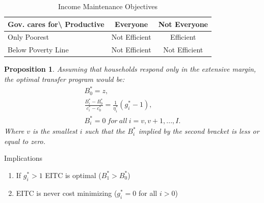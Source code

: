\documentclass[xcolor=pdftex,dvipsnames,table]{beamer}
\newtheorem{prop}{Proposition}
\begin{document}
\begin{frame}[label=imp_literature]
\begin{table}[htbp]
  \centering
  \caption{Income Maintenance Objectives}
    \begin{tabular}{l|cc}
    \toprule
    Gov. cares for\textbackslash{} Productive & Everyone & Not Everyone \\
    \midrule
    Only Poorest & Not Efficient & Efficient \\
    Below Poverty Line & Not Efficient & Not Efficient \\
    \bottomrule
    \end{tabular}
\end{table}
\hyperlink{prop_imp}{}
\end{frame}

\begin{frame}[label=eitc]
\begin{prop}
\label{prop_extensive}
	Assuming that households respond only in the extensive margin, the optimal transfer program would be: 
	\begin{align*}
	B_0^* = z, \nonumber\\		
		\frac{B^*_i-B^*_{0}}{c^*_i-c^*_{0}}=\frac{1}{\eta^*_i}(g_i^*-1),\\
	B^*_i = 0\ for\ all\ i = v, v+1, ...,I. \nonumber 
	\end{align*}
	Where $v$ is the smallest $i$ such that the $B^*_i$ implied by the second bracket is less or equal to zero. 
\end{prop}
Implications
\begin{enumerate}
\item If $g_i^*>1$ EITC is optimal ($B^*_1>B^*_0$)
\item EITC is never cost minimizing ($g_i^*=0$ for all $i>0$)
\end{enumerate}
\end{frame}
\end{document}
